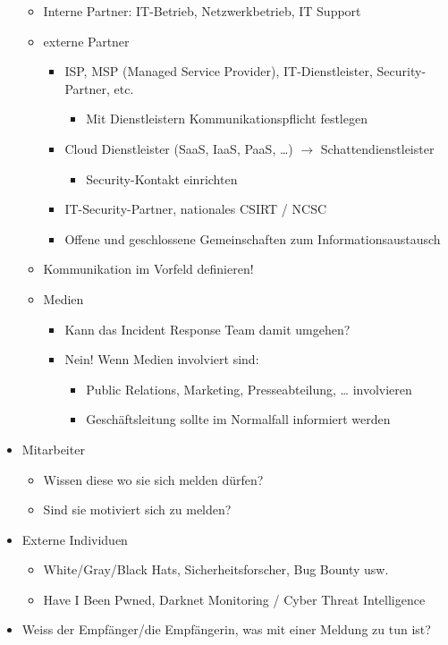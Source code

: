 \begin{itemize}
\begin{itemize}
        \item Interne Partner: IT-Betrieb, Netzwerkbetrieb, IT Support
        \item externe Partner
        \begin{itemize}
            \item ISP, MSP (Managed Service Provider), IT-Dienstleister, Security-Partner, etc.
            \begin{itemize}
                \item Mit Dienstleistern Kommunikationspflicht festlegen
            \end{itemize}
            \item Cloud Dienstleister (SaaS, IaaS, PaaS, …) $\rightarrow$ Schattendienstleister
            \begin{itemize}
                \item Security-Kontakt einrichten
            \end{itemize}
            \item IT-Security-Partner, nationales CSIRT / NCSC
            \item Offene und geschlossene Gemeinschaften zum Informationsaustausch
        \end{itemize}
        \item Kommunikation im Vorfeld definieren!
        \item Medien
        \begin{itemize}
            \item Kann das Incident Response Team damit umgehen?
            \item Nein! Wenn Medien involviert sind:
            \begin{itemize}
                \item Public Relations, Marketing, Presseabteilung, … involvieren
                \item Geschäftsleitung sollte im Normalfall informiert werden
            \end{itemize}
        \end{itemize}
    \end{itemize}
    \item Mitarbeiter
    \begin{itemize}
        \item Wissen diese wo sie sich melden dürfen?
        \item Sind sie motiviert sich zu melden?
    \end{itemize}
    \item Externe Individuen
    \begin{itemize}
        \item White/Gray/Black Hats, Sicherheitsforscher, Bug Bounty usw.
        \item Have I Been Pwned, \glqq Darknet Monitoring\grqq{} / \glqq Cyber Threat Intelligence\grqq
    \end{itemize}
    \item Weiss der Empfänger/die Empfängerin, was mit einer Meldung zu tun ist?
\end{itemize}

